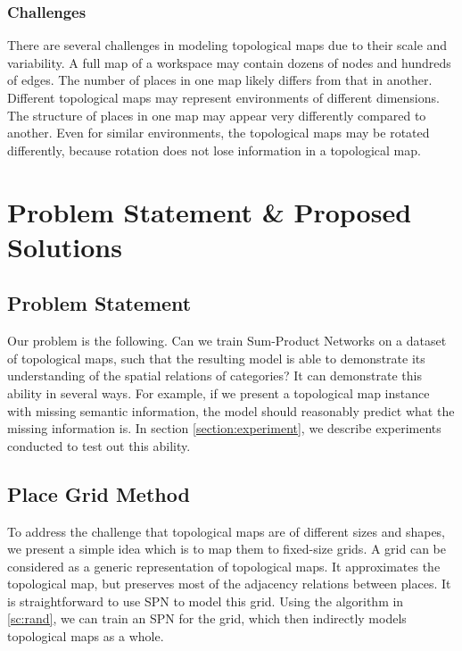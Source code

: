 \documentclass[10pt, titlepage]{article}
\theoremstyle{definition}
\begin{document}
\subsubsection{Challenges}
There are several challenges in modeling topological maps due to their scale and variability. A full map of a workspace may contain dozens of nodes and hundreds of edges. The number of places in one map likely differs from that in another. Different topological maps may represent environments of different dimensions. The structure of places in one map may appear very differently compared to another. Even for similar environments, the topological maps may be rotated differently, because rotation does not lose information in a topological map. 

\newpage
\section{Problem Statement \& Proposed Solutions}\label{section:sol}
\subsection{Problem Statement}\label{section:problem}

Our problem is the following. Can we train Sum-Product Networks on a dataset of topological maps, such that the resulting model is able to demonstrate its understanding of the spatial relations of categories? It can demonstrate this ability in several ways. For example, if we present a topological map instance with missing semantic information, the model should reasonably predict what the missing information is. In section \ref{section:experiment}, we describe experiments conducted to test out this ability.

\subsection{Place Grid Method}\label{section:grid}
To address the challenge that topological maps are of different sizes and shapes, we present a simple idea which is to map them to fixed-size grids. A grid can be considered as a generic representation of topological maps. It approximates the topological map, but preserves most of the adjacency relations between places. It is straightforward to use SPN to model this grid. Using the algorithm in \ref{sc:rand}, we can train an SPN for the grid, which then indirectly models topological maps as a whole. 
\end{document}
